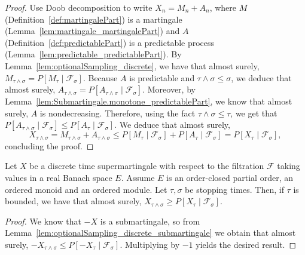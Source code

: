 \begin{proof}
Use Doob decomposition to write $X_n = M_n + A_n$, where $M$ (Definition~\ref{def:martingalePart}) is a martingale (Lemma~\ref{lem:martingale_martingalePart}) and $A$ (Definition~\ref{def:predictablePart}) is a predictable process (Lemma~\ref{lem:predictable_predictablePart}). By Lemma~\ref{lem:optionalSampling_discrete}, we have that almost surely, $M_{\tau \wedge \sigma} = P[M_{\tau} \mid \mathcal{F}_{\sigma}]$. Because $A$ is predictable and $\tau \wedge \sigma \le \sigma$, we deduce that almost surely, $A_{\tau \wedge \sigma} = P[A_{\tau \wedge \sigma} \mid \mathcal{F}_\sigma]$. Moreover, by Lemma~\ref{lem:Submartingale.monotone_predictablePart}, we know that almost surely, $A$ is nondecreasing. Therefore, using the fact $\tau \wedge \sigma \le \tau$, we get that $P[A_{\tau \wedge \sigma} \mid \mathcal{F}_\sigma] \le P[A_\tau \mid \mathcal{F}_\sigma]$. We deduce that almost surely,
$$X_{\tau \wedge \sigma} = M_{\tau \wedge \sigma} + A_{\tau \wedge \sigma} \le P[M_\tau \mid \mathcal{F}_\sigma] + P[A_\tau \mid \mathcal{F}_\sigma] = P[X_\tau \mid \mathcal{F}_\sigma],$$
concluding the proof.
\end{proof}

\begin{lemma}\label{lem:optionalSampling_discrete_supermartingale}
  \leanok
Let $X$ be a discrete time supermartingale with respect to the filtration $\mathcal{F}$ taking values in a real Banach space $E$. Assume $E$ is an order-closed partial order, an ordered monoid and an ordered module. Let $\tau, \sigma$ be stopping times. Then, if $\tau$ is bounded, we have that almost surely, $X_{\tau \wedge \sigma} \ge P[X_{\tau} \mid \mathcal{F}_{\sigma}]$.
\end{lemma}

\begin{proof}
We know that $-X$ is a submartingale, so from Lemma~\ref{lem:optionalSampling_discrete_submartingale} we obtain that almost surely, $-X_{\tau \wedge \sigma} \le P[-X_{\tau} \mid \mathcal{F}_{\sigma}]$. Multiplying by $-1$ yields the desired result.
\end{proof}

